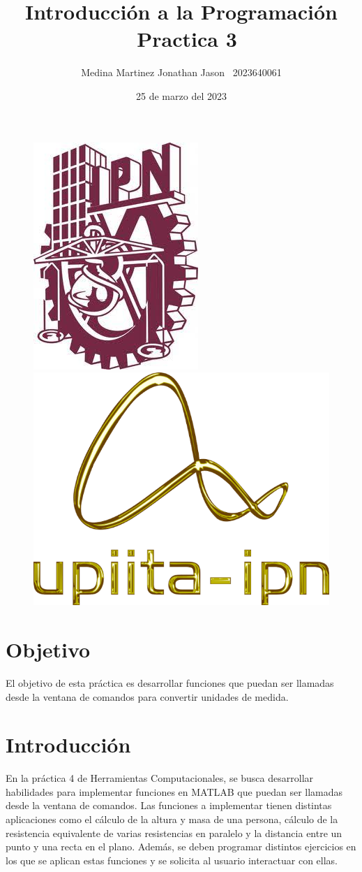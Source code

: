 \documentclass{article}
\title{Introducción a la Programación \ Practica 3}
\author{Medina Martinez Jonathan Jason \ 2023640061}
\date{25 de marzo del 2023}
\begin{document}
	
	\fontsize{12}{16}\selectfont
	
	\begin{figure}[t] %
		
		\includegraphics[width=2.5 cm]{Logo1.jpeg}
		\hfill
		\includegraphics[width=3 cm]{Logo2.png}
		
	\end{figure}
	
	\maketitle %
	\newpage
	
	\tableofcontents %
	\newpage
	
	\section{Objetivo}
	
	El objetivo de esta práctica es desarrollar funciones que puedan ser llamadas desde la ventana de comandos para convertir unidades de medida.
	
	\section{Introducción}
	
	En la práctica 4 de Herramientas Computacionales, se busca desarrollar habilidades para implementar funciones en MATLAB que puedan ser llamadas desde la ventana de comandos. Las funciones a implementar tienen distintas aplicaciones como el cálculo de la altura y masa de una persona, cálculo de la resistencia equivalente de varias resistencias en paralelo y la distancia entre un punto y una recta en el plano. Además, se deben programar distintos ejercicios en los que se aplican estas funciones y se solicita al usuario interactuar con ellas.
	
\end{document}
